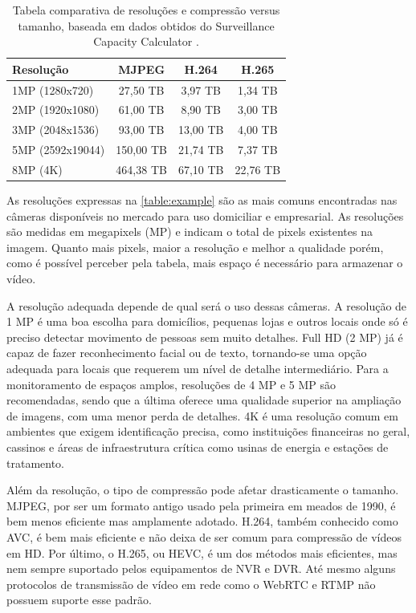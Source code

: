 \documentclass[12pt, %
openright, 
oneside, %
a4paper,    %
brazil]{facom-ufu-abntex2}
\begin{document}
\begin{table}[ht]
	\centering
	\caption{Tabela comparativa de resoluções e compressão versus tamanho,
		baseada em dados obtidos do Surveillance Capacity Calculator
		\cite{surveillancecalculator}.}
	\begin{tabular}{|l|c|c|c|}
		\hline
		Resolução        & MJPEG     & H.264    & H.265    \\ \hline
		1MP (1280x720)   & 27,50 TB  & 3,97 TB  & 1,34 TB  \\
		2MP (1920x1080)  & 61,00 TB  & 8,90 TB  & 3,00 TB  \\
		3MP (2048x1536)  & 93,00 TB  & 13,00 TB & 4,00 TB  \\
		5MP (2592x19044) & 150,00 TB & 21,74 TB & 7,37 TB  \\
		8MP (4K)         & 464,38 TB & 67,10 TB & 22,76 TB \\ \hline

	\end{tabular}
	\label{table:example}
\end{table}

As resoluções expressas na \autoref{table:example} são as mais comuns
encontradas nas câmeras disponíveis no mercado para uso domiciliar e
empresarial. As resoluções são medidas em megapixels (MP) e indicam o total de
pixels existentes na imagem. Quanto mais pixels, maior a resolução e melhor a
qualidade porém, como é possível perceber pela tabela, mais espaço é necessário
para armazenar o vídeo.

A resolução adequada depende de qual será o uso dessas câmeras. A resolução de
1 MP é uma boa escolha para domicílios, pequenas lojas e outros locais onde só
é preciso detectar movimento de pessoas sem muito detalhes. Full HD (2 MP) já é
capaz de fazer reconhecimento facial ou de texto, tornando-se uma opção
adequada para locais que requerem um nível de detalhe intermediário. Para a
monitoramento de espaços amplos, resoluções de 4 MP e 5 MP são recomendadas,
sendo que a última oferece uma qualidade superior na ampliação de imagens, com
uma menor perda de detalhes. 4K é uma resolução comum em ambientes que exigem
identificação precisa, como instituições financeiras no geral, cassinos e áreas
de infraestrutura crítica como usinas de energia e estações de tratamento.

Além da resolução, o tipo de compressão pode afetar drasticamente o tamanho.
MJPEG, por ser um formato antigo usado pela primeira em meados de 1990, é bem
menos eficiente mas amplamente adotado. H.264, também conhecido como AVC, é bem
mais eficiente e não deixa de ser comum para compressão de vídeos em HD. Por
último, o H.265, ou HEVC, é um dos métodos mais eficientes, mas nem sempre
suportado pelos equipamentos de NVR e DVR. Até mesmo alguns protocolos de
transmissão de vídeo em rede como o WebRTC e RTMP não possuem suporte esse
padrão.
\end{document}
